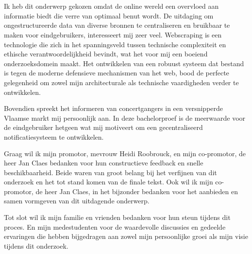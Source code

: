 
\chapter*{}%
\label{ch:voorwoord}


Ik heb dit onderwerp gekozen omdat de online wereld een overvloed aan informatie biedt die verre van optimaal benut wordt. De uitdaging om ongestructureerde data van diverse bronnen te centraliseren en bruikbaar te maken voor eindgebruikers, interesseert mij zeer veel. 
Webscraping is een technologie die zich in het spanningsveld tussen technische complexiteit en ethische verantwoordelijkheid bevindt, wat het voor mij een boeiend onderzoeksdomein maakt. Het ontwikkelen van een robuust systeem dat bestand is tegen de moderne defensieve mechanismen van het web, bood de perfecte gelegenheid om zowel mijn architecturale als technische vaardigheden verder te ontwikkelen.

Bovendien spreekt het informeren van concertgangers in een versnipperde Vlaamse markt mij persoonlijk aan. In deze bachelorproef is de meerwaarde voor de eindgebruiker hetgeen wat mij motiveert om een gecentraliseerd notificatiesysteem te ontwikkelen.

Graag wil ik mijn promotor, mevrouw Heidi Roobrouck, en mijn co-promotor, de heer Jan Claes bedanken voor hun constructieve feedback en snelle beschikbaarheid. Beide waren van groot belang bij het verfijnen van dit onderzoek en het tot stand komen van de finale tekst. 
Ook wil ik mijn co-promotor, de heer Jan Claes, in het bijzonder bedanken voor het aanbieden en samen vormgeven van dit uitdagende onderwerp.

Tot slot wil ik mijn familie en vrienden bedanken voor hun steun tijdens dit proces. En mijn medestudenten voor de waardevolle discussies en gedeelde ervaringen die hebben bijgedragen aan zowel mijn persoonlijke groei als mijn visie tijdens dit onderzoek.


